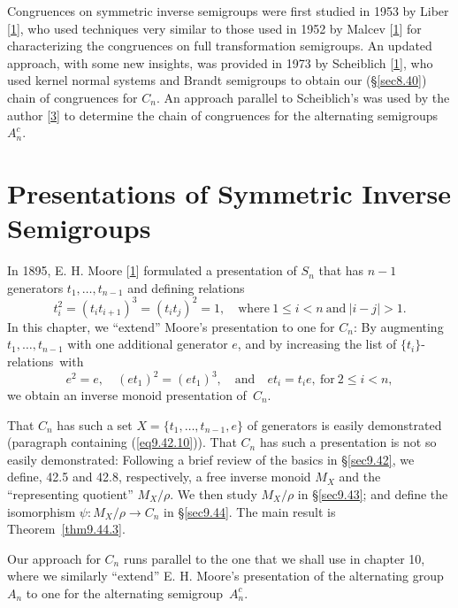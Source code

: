 \documentclass{surv-l}
\numberwithin{equation}{section}
\numberwithin{table}{section}
\numberwithin{figure}{section}
\theoremstyle{definition}
\begin{document}
Congruences on symmetric inverse semigroups were first studied in
1953 by Liber [\hyperlink{bib42}{1}],
who used techniques very similar to those used in 1952 by
Malcev [\hyperlink{bib49}{1}] for
characterizing the congruences on full transformation semigroups.
An updated approach, with some new insights, was provided in 1973
by Scheiblich
[\hyperlink{bib68}{1}], who used kernel normal systems
and Brandt semigroups to obtain our (\S\ref{sec8.40}) chain of
congruences for $C_{n}$. An approach parallel to Scheiblich's was
used by the author [\hyperlink{bib43b}{3}] to determine
the chain of congruences for the alternating
semigroups~$A_{n}^{c}$.

\chapter{Presentations of Symmetric Inverse Semigroups}\label{chap9}

In 1895, E. H. Moore
[\hyperlink{bib53}{1}] formulated a presentation of
$S_{n}$ that has $n-1$ generators $t_{1},\ldots, t_{n-1}$ and
defining relations
\[
t_{i}^{2}=(t_{i}t_{i+1})^{3}=(t_{i}t_{j})^{2}=1,\quad \mathrm{where}\ 1\leq
i<n\ \mathrm{and}\ |i-j|>1.
\]
In this chapter, we ``extend'' Moore's presentation to one for
$C_{n}$: By augmenting $t_{1},\ldots, t_{n-1}$ with one additional
generator $e$, and by increasing the list of $\{t_{i}\}$-relations~with
\[
e^{2}=e,\quad (et_{1})^{2}=(et_{1})^{3},\quad \mathrm{and}\quad et_{i}=t_{i}e,\ \mathrm{for}\
2\leq i<n,
\]
we obtain an inverse monoid presentation of~$C_{n}$.

That $C_{n}$ has such a set $X=\{t_{1},\ldots, t_{n-1}, e\}$ of
generators is easily demonstrated (paragraph containing
(\ref{eq9.42.10})). That $C_{n}$ has such a presentation is not so
easily demonstrated: Following a brief review of the basics in
\S\ref{sec9.42}, we define, 42.5 and 42.8, respectively, a free
inverse monoid $M_{X}$ and the ``representing quotient''
$M_{X}/\rho$. We then study $M_{X}/\rho$ in \S\ref{sec9.43}; and
define the isomorphism $\psi : M_{X}/\rho\rightarrow C_{n}$ in
\S\ref{sec9.44}. The main result is Theorem~\ref{thm9.44.3}.

Our approach for $C_{n}$ runs parallel to the one that we shall
use in chapter 10, where we similarly ``extend'' E. H.
Moore's presentation of the alternating group
$A_{n}$\index{presentation(s)!of~$A_{n}$} to one for the
alternating
semigroup~$A_{n}^{c}$.
\end{document}
